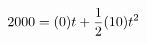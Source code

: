 \documentclass[preview]{standalone}
\begin{document}
\begin{align*}
\special{dvisvgm:raw <g id='unique000'>}2000 = (0)t + \frac{1}{2}(10)t^2\special{dvisvgm:raw </g>}
\end{align*}
\end{document}
